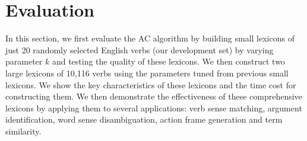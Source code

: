 \section{Evaluation}
\label{sec:eval}

In this section, we first evaluate the AC algorithm by building small lexicons of
just 20 randomly selected English verbs (our development set)
by varying parameter $k$ and testing the quality
of these lexicons. 
We then construct two large lexicons of 10,116 verbs using the 
parameters tuned from previous small lexicons. 
We show the key characteristics of these lexicons and the time cost 
for constructing them.
We then demonstrate the effectiveness of these comprehensive lexicons
by applying them to several applications: verb sense matching,
argument identification, word sense disambiguation,
action frame generation and term similarity.



%







